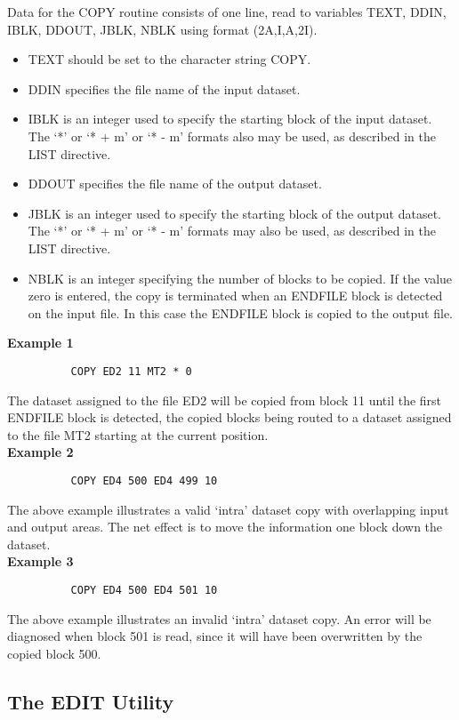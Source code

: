 \documentclass[11pt,fleqn]{article}
\begin{document}
Data for the COPY routine consists of one line, read to variables
TEXT, DDIN, IBLK, DDOUT, JBLK, NBLK using format (2A,I,A,2I).
\begin{itemize}
\item TEXT should be set to the character string COPY.
\item DDIN specifies the file name of the input dataset.
\item IBLK is an integer used to specify the starting block of the
input dataset. The `*' or `* + m' or
`* - m' formats also may be used, as described in the LIST
directive.
\item DDOUT specifies the file name of the output dataset.
\item JBLK is an integer used to specify the starting block of the
output dataset. The `*' or `* + m' or
`* - m' formats may also be used, as described in the LIST
directive.
\item NBLK is an integer specifying the number of blocks to be copied.
If the value zero is entered, the copy is terminated
when an ENDFILE block is detected on the input file. In
this case the ENDFILE block is copied to the output file.
\end{itemize}
{\bf Example 1}
{
\footnotesize
\begin{verbatim}
          COPY ED2 11 MT2 * 0
\end{verbatim}
}
The dataset assigned to the file ED2 will be copied from block 11
until the first ENDFILE block is detected, the copied blocks being
routed to a dataset assigned to the file MT2 starting at the
current position.\\

{\bf Example 2}
{
\footnotesize
\begin{verbatim}
          COPY ED4 500 ED4 499 10
\end{verbatim}
}
The above example illustrates a valid `intra' dataset copy with
overlapping input and output areas. The net effect is to move the
information one block down the dataset.\\

{\bf Example 3}
{
\footnotesize
\begin{verbatim}
          COPY ED4 500 ED4 501 10
\end{verbatim}
}
The above example illustrates an invalid `intra' dataset copy. An error
will be diagnosed when block 501 is read, since it will have been
overwritten by the copied block 500.


\subsection{The EDIT Utility}
\end{document}
